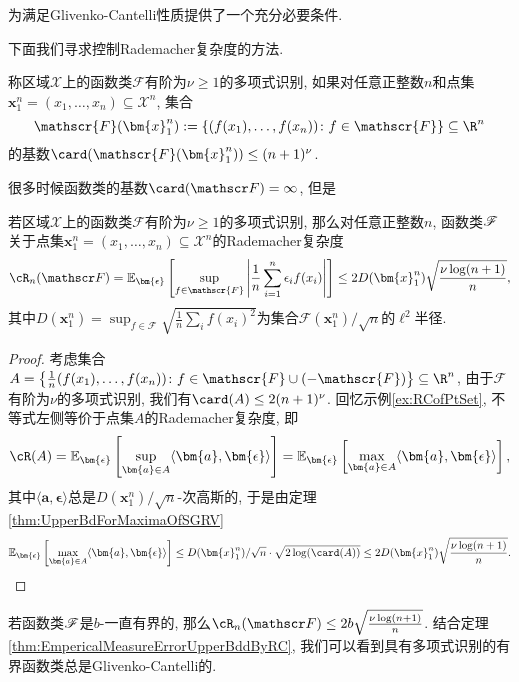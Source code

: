 为满足Glivenko-Cantelli性质提供了一个充分必要条件. 

下面我们寻求控制Rademacher复杂度的方法. 

\begin{definition}[多项式识别]
	称区域$\mathcal{X}$上的函数类$\mathscr{F}$有阶为$\nu \geq 1$的多项式识别, 如果对任意正整数$n$和点集$\bm{x}_1^n = (x_1, \dots, x_n) \subseteq \mathcal{X}^n$, 集合
	\begin{equation*}
		\mathscr{F}(\bm{x}_1^n) 
		:= \{(f(x_1), \dots, f(x_n)) \colon f \in \mathscr{F}\}
		\subseteq \R^n
	\end{equation*}
	的基数$\card(\mathscr{F}(\bm{x}_1^n)) \leq (n+1)^{\nu}$. 
\end{definition}

很多时候函数类的基数$\card(\sF) = \infty$, 但是

\begin{lemma}
	若区域$\mathcal{X}$上的函数类$\mathscr{F}$有阶为$\nu \geq 1$的多项式识别, 那么对任意正整数$n$, 函数类$\mathscr{F}$关于点集$\bm{x}_1^n = (x_1, \dots, x_n) \subseteq \mathcal{X}^n$的Rademacher复杂度
	\begin{equation*}
		\cR_n(\sF)
		= \mathbb{E}_{\bm{\epsilon}} \left[ \sup_{f \in \mathscr{F}} \left| \frac{1}{n} \sum_{i=1}^n \epsilon_i f(x_i) \right| \right]
		\leq 2 D(\bm{x}_1^n) \sqrt{\frac{\nu \log(n+1)}{n}}, 
	\end{equation*}
	其中$D(\bm{x}_1^n) = \sup_{f \in \mathscr{F}} \sqrt{\frac{1}{n} \sum_i f(x_i)^2}$为集合$\mathscr{F}(\bm{x}_1^n) / \sqrt{n}$的$\ell^2$半径. 
\end{lemma}
\begin{proof}
	考虑集合$A = \left\{ \frac{1}{n} (f(x_1), \dots, f(x_n)) \colon f \in \mathscr{F} \cup (-\mathscr{F}) \right\} \subseteq \R^n$, 由于$\mathscr{F}$有阶为$\nu$的多项式识别, 我们有$\card(A) \leq 2 (n+1)^{\nu}$. 
	回忆示例\ref{ex:RCofPtSet}, 不等式左侧等价于点集$A$的Rademacher复杂度, 即
	\begin{equation*}
		\cR(A) 
		= \mathbb{E}_{\bm{\epsilon}}\left[ \sup_{\bm{a} \in A} \langle \bm{a}, \bm{\epsilon} \rangle \right]
		= \mathbb{E}_{\bm{\epsilon}}\left[ \max_{\bm{a} \in A} \langle \bm{a}, \bm{\epsilon} \rangle \right], 
	\end{equation*}
	其中$\langle \bm{a}, \bm{\epsilon} \rangle$总是$D(\bm{x}_1^n) / \sqrt{n}$-次高斯的, 于是由定理\ref{thm:UpperBdForMaximaOfSGRV}
	\begin{align*}
		\mathbb{E}_{\bm{\epsilon}}\left[ \max_{\bm{a} \in A} \langle \bm{a}, \bm{\epsilon} \rangle \right] 
		\leq D(\bm{x}_1^n) / \sqrt{n} \cdot \sqrt{2 \log(\card(A))}
		\leq 2 D(\bm{x}_1^n) \sqrt{\frac{\nu \log(n+1)}{n}}. 
	\end{align*}
\end{proof}
\begin{remark}
	若函数类$\mathscr{F}$是$b$-一直有界的, 那么$\cR_n(\sF) \leq 2b \sqrt{\frac{\nu \log(n+1)}{n}}$. 
	结合定理\ref{thm:EmpericalMeasureErrorUpperBddByRC}, 我们可以看到具有多项式识别的有界函数类总是Glivenko-Cantelli的. 
\end{remark}

